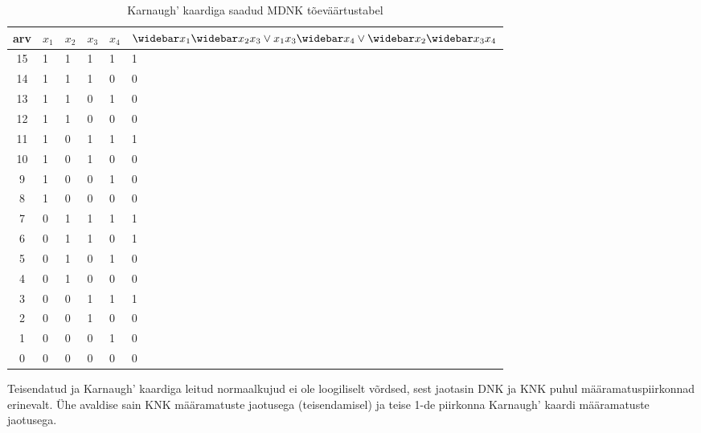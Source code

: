 \begin{table}[H]
\centering
\caption{Karnaugh' kaardiga saadud MDNK tõeväärtustabel}
\label{my-label}
\begin{tabular}{|c|l|l|l|l||l|}
\hline
arv & $x_1$ & $x_2$ & $x_3$ & $x_4$ & $\wb{x_1}\wb{x_2}x_3 \lor x_1x_3\wb{x_4} \lor \wb{x_2}\wb{x_3}x_4$ \\\hline
15 & 1 & 1 & 1 & 1 & 1                                         \\ \hline
14 & 1 & 1 & 1 & 0 & 0                                         \\ \hline
13 & 1 & 1 & 0 & 1 & 0                                         \\ \hline
12 & 1 & 1 & 0 & 0 & 0                                         \\ \hline
11 & 1 & 0 & 1 & 1 & 1                                         \\ \hline
10 & 1 & 0 & 1 & 0 & 0                                         \\ \hline
9 & 1 & 0 & 0 & 1 & 0                                         \\ \hline
8 & 1 & 0 & 0 & 0 & 0                                         \\ \hline
7 & 0 & 1 & 1 & 1 & 1                                         \\ \hline
6 & 0 & 1 & 1 & 0 & 1                                         \\ \hline
5 & 0 & 1 & 0 & 1 & 0                                         \\ \hline
4 & 0 & 1 & 0 & 0 & 0                                         \\ \hline
3 & 0 & 0 & 1 & 1 & 1                                         \\ \hline
2 & 0 & 0 & 1 & 0 & 0                                         \\ \hline
1 & 0 & 0 & 0 & 1 & 0                                         \\ \hline
0 & 0 & 0 & 0 & 0 & 0                                         \\ \hline
\end{tabular}
\end{table}
Teisendatud ja Karnaugh' kaardiga leitud normaalkujud ei ole loogiliselt võrdsed, sest jaotasin DNK ja KNK puhul määramatuspiirkonnad erinevalt. Ühe avaldise sain KNK määramatuste jaotusega (teisendamisel) ja teise 1-de piirkonna Karnaugh' kaardi määramatuste jaotusega.
